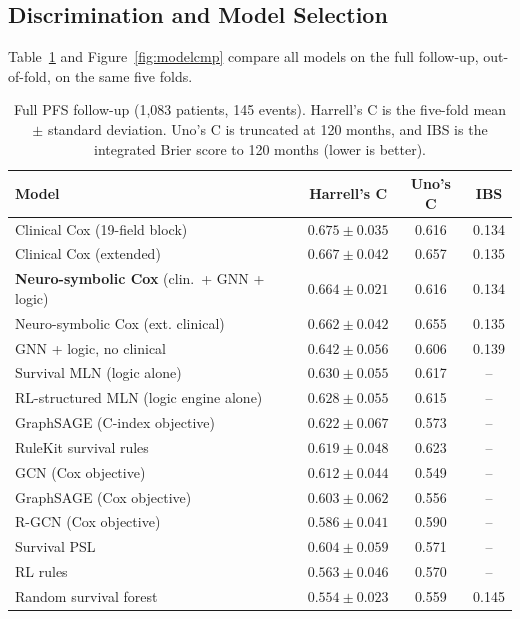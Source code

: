 \documentclass{mnnit}
\begin{document}
\subsection{Discrimination and Model Selection}
Table~\ref{tab:ns} and Figure~\ref{fig:modelcmp} compare all models on the full follow-up, out-of-fold, on the same
five folds.

\begin{table}[htbp]
  \centering
  \small\setlength{\tabcolsep}{4pt}
  \caption{Full PFS follow-up (1,083 patients, 145 events). Harrell's C is the five-fold mean $\pm$ standard
  deviation. Uno's C is truncated at 120 months, and IBS is the integrated Brier score to 120 months (lower is better).}
  \label{tab:ns}
  \begin{tabular}{lccc}
    \toprule
    Model & Harrell's C & Uno's C & IBS \\
    \midrule
    Clinical Cox (19-field block) & $0.675 \pm 0.035$ & 0.616 & 0.134 \\
    Clinical Cox (extended) & $0.667 \pm 0.042$ & 0.657 & 0.135 \\
    \textbf{Neuro-symbolic Cox} (clin.\ + GNN + logic) & $\mathbf{0.664 \pm 0.021}$ & 0.616 & 0.134 \\
    Neuro-symbolic Cox (ext. clinical) & $0.662 \pm 0.042$ & 0.655 & 0.135 \\
    GNN + logic, no clinical & $0.642 \pm 0.056$ & 0.606 & 0.139 \\
    Survival MLN (logic alone) & $0.630 \pm 0.055$ & 0.617 & -- \\
    RL-structured MLN (logic engine alone) & $0.628 \pm 0.055$ & 0.615 & -- \\
    GraphSAGE (C-index objective) & $0.622 \pm 0.067$ & 0.573 & -- \\
    RuleKit survival rules & $0.619 \pm 0.048$ & 0.623 & -- \\
    GCN (Cox objective) & $0.612 \pm 0.044$ & 0.549 & -- \\
    GraphSAGE (Cox objective) & $0.603 \pm 0.062$ & 0.556 & -- \\
    R-GCN (Cox objective) & $0.586 \pm 0.041$ & 0.590 & -- \\
    Survival PSL & $0.604 \pm 0.059$ & 0.571 & -- \\
    RL rules & $0.563 \pm 0.046$ & 0.570 & -- \\
    Random survival forest & $0.554 \pm 0.023$ & 0.559 & 0.145 \\
    \bottomrule
  \end{tabular}
\end{table}
\end{document}
